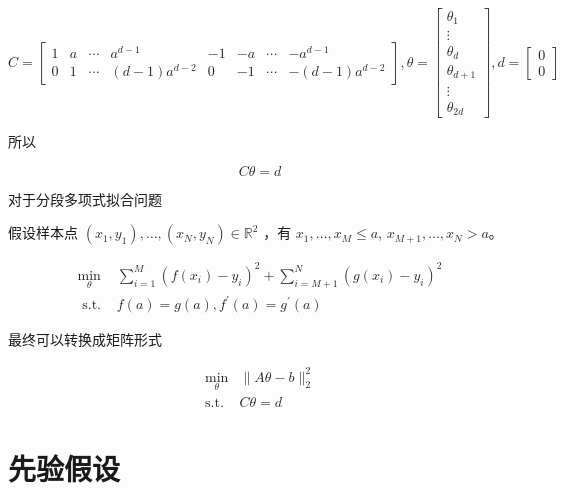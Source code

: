 \begin{notation}
    $$ C=\left[\begin{array}{cccccccc}1 & a & \cdots & a^{d-1} & -1 & -a & \cdots & -a^{d-1} \\ 0 & 1 & \cdots & (d-1) a^{d-2} & 0 & -1 & \cdots & -(d-1) a^{d-2}\end{array}\right], 
    \theta =\left[\begin{array}{ c }
        \theta _{1}\\
        \vdots \\
        \theta _{d}\\
        \theta _{d+1}\\
        \vdots \\
        \theta _{2d}
        \end{array}\right], 
    d=\left[\begin{array}{l}0 \\ 0\end{array}\right] $$
\end{notation}


所以

$$ C \theta=d $$

对于分段多项式拟合问题

\begin{problem}[分段多项式拟合问题]
    假设样本点 $ \left(x_{1}, y_{1}\right), \ldots,\left(x_{N}, y_{N}\right) \in \mathbb{R}^{2} $ ，有 $ x_{1}, \ldots, x_{M} \leq a $, $ x_{M+1}, \ldots, x_{N}>a $。

     $$\begin{array}{ll}\min _{\theta} & \sum_{i=1}^{M}\left(f\left(x_{i}\right)-y_{i}\right)^{2}+\sum_{i=M+1}^{N}\left(g\left(x_{i}\right)-y_{i}\right)^{2} \\ \text { s.t. } & f(a)=g(a), f^{\prime}(a)=g^{\prime}(a)\end{array}$$
\end{problem}

最终可以转换成矩阵形式

\begin{problem}
    $$\begin{aligned}
        \min _{\theta}&\|A \theta-b\|_{2}^{2}\\
       \text{s.t.} & C \theta=d
    \end{aligned}$$

\end{problem}

\section{先验假设}

